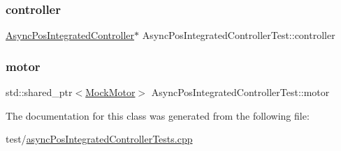 \subsubsection{\texorpdfstring{controller}{controller}}
{\footnotesize\ttfamily \mbox{\hyperlink{classokapi_1_1AsyncPosIntegratedController}{Async\+Pos\+Integrated\+Controller}}$\ast$ Async\+Pos\+Integrated\+Controller\+Test\+::controller\hspace{0.3cm}{\ttfamily [protected]}}

\mbox{\label{classAsyncPosIntegratedControllerTest_ae26bfd19b39aa0f501d14ec97b9eaefa}} 
\subsubsection{\texorpdfstring{motor}{motor}}
{\footnotesize\ttfamily std\+::shared\+\_\+ptr$<$\mbox{\hyperlink{classokapi_1_1MockMotor}{Mock\+Motor}}$>$ Async\+Pos\+Integrated\+Controller\+Test\+::motor\hspace{0.3cm}{\ttfamily [protected]}}



The documentation for this class was generated from the following file\+:\begin{DoxyCompactItemize}
\item 
test/\mbox{\hyperlink{test_2asyncPosIntegratedControllerTests_8cpp}{async\+Pos\+Integrated\+Controller\+Tests.\+cpp}}\end{DoxyCompactItemize}
